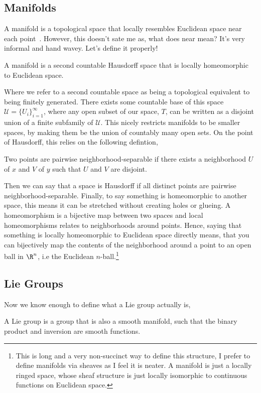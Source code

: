 \subsection{Manifolds}
A manifold is a topological space that locally resembles Euclidean space near each point~\cite{wmwMan}. However, this doesn't sate me as, what does near mean? It's very informal and hand wavey. Let's define it properly!
\begin{ndefi}[Manifold]
  A manifold is a second countable Hausdorff space that is locally homeomorphic to Euclidean space.
\end{ndefi}
Where we refer to a second countable space as being a topological equivalent to being finitely generated. There exists some countable base of this space $\mathcal{U} = \{U_i\}_{i=1}^\infty$, where any open subset of our space, $T$, can be written as a disjoint union of a finite subfamily of $\mathcal{U}$. This nicely restricts manifolds to be smaller spaces, by making them be the union of countably many open sets. On the point of Hausdorff, this relies on the following defintion,
\begin{ndefi}
  Two points are pairwise neighborhood-separable if there exists a neighborhood $U$ of $x$ and $V$ of $y$ such that $U$ and $V$ are disjoint.
\end{ndefi}
Then we can say that a space is Hausdorff if all distinct points are pairwise neighborhood-separable. Finally, to say something is homeomorphic to another space, this means it can be stretched without creating holes or glueing. A homeomorphism is a bijective map between two spaces and local homeomorphisms relates to neighborhoods around points. Hence, saying that something is locally homeomorphic to Euclidean space directly means, that you can bijectively map the contents of the neighborhood around a point to an open ball in $\R^n$, i.e the Euclidean $n$-ball.\footnote{This is long and a very non-succinct way to define this structure, I prefer to define manifolds via sheaves as I feel it is neater. A manifold is just a locally ringed space, whose sheaf structure is just locally isomorphic to continuous functions on Euclidean space.}

\noindent
\subsection{Lie Groups}
Now we know enough to define what a Lie group actually is,
\begin{ndefi}
  A Lie group is a group that is also a smooth manifold, such that the binary product and inversion are smooth functions.
\end{ndefi}

